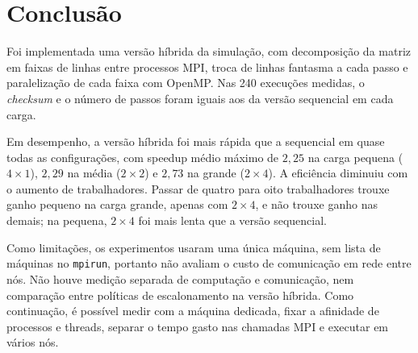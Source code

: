\documentclass[11pt,a4paper]{article}
\begin{document}
\section{Conclusão}

Foi implementada uma versão híbrida da simulação, com decomposição da matriz
em faixas de linhas entre processos MPI, troca de linhas fantasma a cada
passo e paralelização de cada faixa com OpenMP. Nas 240 execuções medidas, o
\emph{checksum} e o número de passos foram iguais aos da versão sequencial
em cada carga.

Em desempenho, a versão híbrida foi mais rápida que a sequencial em quase
todas as configurações, com speedup médio máximo de $2{,}25$ na carga
pequena ($4\times1$), $2{,}29$ na média ($2\times2$) e $2{,}73$ na grande
($2\times4$). A eficiência diminuiu com o aumento de trabalhadores. Passar
de quatro para oito trabalhadores trouxe ganho pequeno na carga grande,
apenas com $2\times4$, e não trouxe ganho nas demais; na pequena,
$2\times4$ foi mais lenta que a versão sequencial.

Como limitações, os experimentos usaram uma única máquina, sem lista de
máquinas no \texttt{mpirun}, portanto não avaliam o custo de comunicação em
rede entre nós. Não houve medição separada de computação e comunicação, nem
comparação entre políticas de escalonamento na versão híbrida. Como
continuação, é possível medir com a máquina dedicada, fixar a afinidade de
processos e threads, separar o tempo gasto nas chamadas MPI e executar em
vários nós.
\end{document}
